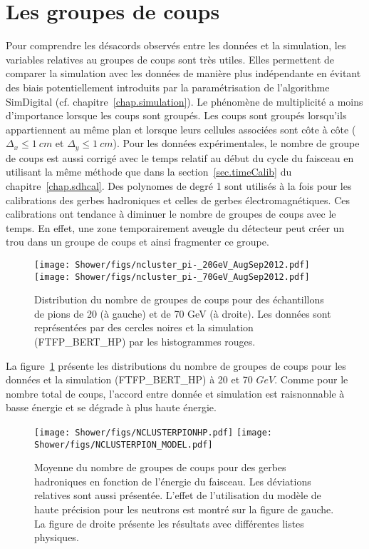 \section{Les groupes de coups}
Pour comprendre les désacords observés entre les données et la simulation, les variables relatives au groupes de coups sont très utiles. Elles permettent de comparer la simulation avec les données de manière plus indépendante en évitant des biais potentiellement introduits par la paramétrisation de l'algorithme SimDigital (cf. chapitre~\ref{chap.simulation}). Le phénomène de multiplicité a moins d'importance lorsque les coups sont groupés. Les coups sont groupés lorsqu'ils appartiennent au même plan et lorsque leurs cellules associées sont côte à côte ($\Delta_x\leq 1~cm$ et $\Delta_y\leq 1~cm$). Pour les données expérimentales, le nombre de groupe de coups est aussi corrigé avec le temps relatif au début du cycle du faisceau en utilisant la même méthode que dans la section~\ref{sec.timeCalib} du chapitre~\ref{chap.sdhcal}. Des polynomes de degré 1 sont utilisés à la fois pour les calibrations des gerbes hadroniques et celles de gerbes électromagnétiques. Ces calibrations ont tendance à diminuer le nombre de groupes de coups avec le temps. En effet, une zone temporairement aveugle du détecteur peut créer un trou dans un groupe de coups et ainsi fragmenter ce groupe.
\begin{figure}[!ht]
  \texttt{[image: Shower/figs/ncluster\_pi-\_20GeV\_AugSep2012.pdf]}
  \texttt{[image: Shower/figs/ncluster\_pi-\_70GeV\_AugSep2012.pdf]}
  \caption{Distribution du nombre de groupes de coups pour des échantillons de pions de 20 (à gauche) et de 70 GeV (à droite). Les données sont représentées par des cercles noires et la simulation (FTFP\_BERT\_HP) par les histogrammes rouges. \label{fig.pi-cluster}}
\end{figure}
La figure~\ref{fig.pi-cluster} présente les distributions du nombre de groupes de coups pour les données et la simulation (FTFP\_BERT\_HP) à 20 et 70 $GeV$. Comme pour le nombre total de coups, l'accord entre donnée et simulation est raisnonnable à basse énergie et se dégrade à plus haute énergie.
\begin{figure}[!ht]
  \texttt{[image: Shower/figs/NCLUSTERPIONHP.pdf]}
  \texttt{[image: Shower/figs/NCLUSTERPION\_MODEL.pdf]}
  \caption{Moyenne du nombre de groupes de coups pour des gerbes hadroniques en fonction de l'énergie du faisceau. Les déviations relatives sont aussi présentée. L'effet de l'utilisation du modèle de haute précision pour les neutrons est montré sur la figure de gauche. La figure de droite présente les résultats avec différentes listes physiques.}
  \label{fig.nhit_pi-_ebeam}
\end{figure}
